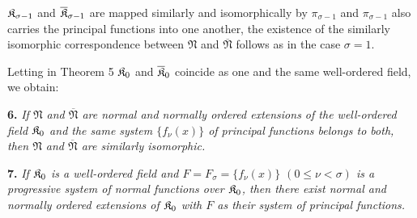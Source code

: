 $\mathfrak K_{\sigma-1}$ and $\overline{\mathfrak K}_{\sigma-1}$ are mapped similarly and isomorphically by $\pi_{\sigma-1}$ and $\pi_{\sigma-1}$ also carries the principal functions into one another, the existence of the similarly isomorphic correspondence between $\mathfrak N$ and $\overline{\mathfrak N}$ follows as in the case $\sigma=1$.

Letting in Theorem 5 $\mathfrak K_0$ and $\overline{\mathfrak K}_0$ coincide as one and the same well-ordered field, we obtain:

\textbf{6.} \emph{If $\mathfrak N$ and $\overline{\mathfrak N}$ are normal and normally ordered extensions of the well-ordered field $\mathfrak K_0$ and the same system $\{f_\nu(x)\}$ of principal functions belongs to both, then $\mathfrak N$ and $\overline{\mathfrak N}$ are similarly isomorphic.}

\textbf{7.} \emph{If $\mathfrak K_0$ is a well-ordered field and $F=F_\sigma=\{f_\nu(x)\}$ $(0\leq\nu<\sigma)$ is a progressive system of normal functions over $\mathfrak K_0$, then there exist normal and normally ordered extensions of $\mathfrak K_0$ with $F$ as their system of principal functions.}

